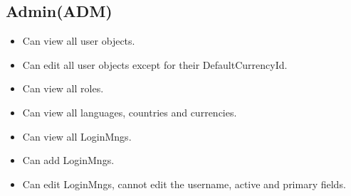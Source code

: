 \subsection{Admin(ADM)}
\begin{itemize}
    \item Can view all user objects.
    \item Can edit all user objects except for their DefaultCurrencyId.
    \item Can view all roles.
    \item Can view all languages, countries and currencies.
    \item Can view all LoginMngs.
    \item Can add LoginMngs.
    \item Can edit LoginMngs, cannot edit the username, active and primary fields.
\end{itemize}